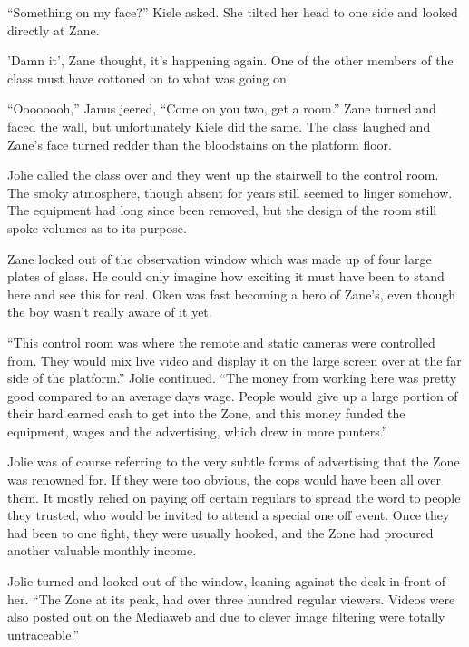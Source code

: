 ``Something on my face?'' Kiele asked.  She tilted her head to one side and looked directly at Zane.

'Damn it', Zane thought, it's happening again.  One of the other members of the class must have cottoned on to what was going on.  

``Oooooooh,'' Janus jeered, ``Come on you two, get a room.''  Zane turned and faced the wall, but unfortunately Kiele did the same.  The class laughed and Zane's face turned redder than the bloodstains on the platform floor.

Jolie called the class over and they went up the stairwell to the control room.  The smoky atmosphere, though absent for years still seemed to linger somehow.  The equipment had long since been removed, but the design of the room still spoke volumes as to its purpose.  

Zane looked out of the observation window which was made up of four large plates of glass.  He could only imagine how exciting it must have been to stand here and see this for real.  Oken was fast becoming a hero of Zane's, even though the boy wasn't really aware of it yet.  

``This control room was where the remote and static cameras were controlled from.  They would mix live video and display it on the large screen over at the far side of the platform.''  Jolie continued.  ``The money from working here was pretty good compared to an average days wage.  People would give up a large portion of their hard earned cash to get into the Zone, and this money funded the equipment, wages and the advertising, which drew in more punters.''

Jolie was of course referring to the very subtle forms of advertising that the Zone was renowned for.  If they were too obvious, the cops would have been all over them.  It mostly relied on paying off certain regulars to spread the word to people they trusted, who would be invited to attend a special one off event.  Once they had been to one fight, they were usually hooked, and the Zone had procured another valuable monthly income.

Jolie turned and looked out of the window, leaning against the desk in front of her.  ``The Zone at its peak, had over three hundred regular viewers.  Videos were also posted out on the Mediaweb and due to clever image filtering were totally untraceable.''



\thoughtbreak



